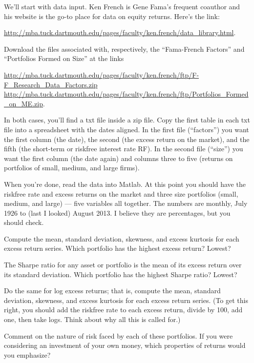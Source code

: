 \documentclass[11pt]{exam}
\begin{document}
\begin{questions}
We'll start with data input.  Ken French is Gene Fama's frequent coauthor
and his website is the go-to place for data on equity returns.
Here's the link:

{\small
\url{http://mba.tuck.dartmouth.edu/pages/faculty/ken.french/data_library.html}}.

Download the files associated with, respectively, the ``Fama-French Factors''
and ``Portfolios Formed on Size'' at the links

{\small
\url{http://mba.tuck.dartmouth.edu/pages/faculty/ken.french/ftp/F-F_Research_Data_Factors.zip} \\
\url{http://mba.tuck.dartmouth.edu/pages/faculty/ken.french/ftp/Portfolios_Formed_on_ME.zip}.
}

In both cases, you'll find a txt file inside a zip file.
Copy the first table in each txt file into a spreadsheet with the dates aligned.
In the first file (``factors'') you want the first column (the date),
the second (the excess return on the market),
and the fifth (the short-term or riskfree interest rate RF).
In the second file (``size'') you want the first column (the date again)
and columns three to five (returns on portfolios of small, medium, and large firms).

When you're done, read the data into Matlab.
At this point you should have the riskfree rate and excess returns
on the market and three size portfolios (small, medium, and large) ---
five variables all together.
The numbers are monthly, July 1926 to (last I looked) August 2013.
I believe they are percentages, but you should check.
%
\begin{parts}
\item
Compute the mean, standard deviation, skewness, and excess kurtosis
for each excess return series.
Which portfolio has the highest excess return?  Lowest?

\item The Sharpe ratio for any asset or portfolio is
the mean of its excess return over its standard deviation.
Which portfolio has the highest Sharpe ratio?  Lowest?

\item Do the same for log excess returns;
that is, compute the mean, standard deviation, skewness, and excess kurtosis
for each excess return series.
(To get this right, you should
add the riskfree rate to each excess return,
divide by 100,
add one, then take logs.
Think about why all this is called for.)

\item Comment on the nature of risk faced by each of these portfolios.
If you were considering an investment of your own money,
which properties of returns would you emphasize?
\end{parts}


\end{questions}
\end{document}
